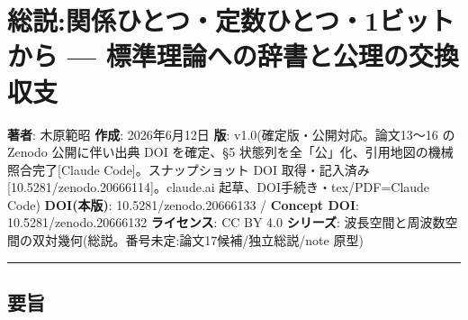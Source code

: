 \documentclass[
]{ltjsarticle}
\author{}
\date{}
\begin{document}
\section{総説:関係ひとつ・定数ひとつ・1ビットから ---
標準理論への辞書と公理の交換収支}\label{ux7dcfux8aacux95a2ux4fc2ux3072ux3068ux3064ux5b9aux6570ux3072ux3068ux30641ux30d3ux30c3ux30c8ux304bux3089-ux6a19ux6e96ux7406ux8ad6ux3078ux306eux8f9eux66f8ux3068ux516cux7406ux306eux4ea4ux63dbux53ceux652f}

\textbf{著者}: 木原範昭 \textbf{作成}: 2026年6月12日 \textbf{版}:
v1.0(確定版・公開対応。論文13〜16 の Zenodo 公開に伴い出典 DOI
を確定、§5 状態列を全「公」化、引用地図の機械照合完了{[}Claude
Code{]}。スナップショット DOI
取得・記入済み{[}10.5281/zenodo.20666114{]}。claude.ai
起草、DOI手続き・tex/PDF=Claude Code) \textbf{DOI(本版)}:
10.5281/zenodo.20666133 / \textbf{Concept DOI}: 10.5281/zenodo.20666132
\textbf{ライセンス}: CC BY 4.0 \textbf{シリーズ}:
波長空間と周波数空間の双対幾何(総説。番号未定:論文17候補/独立総説/note
原型)

\begin{center}\rule{0.5\linewidth}{0.5pt}\end{center}

\subsection{要旨}\label{ux8981ux65e8}
\end{document}
